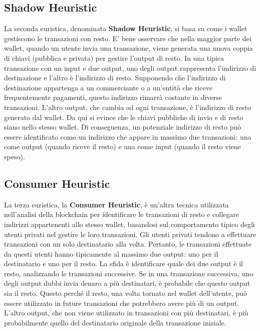 \subsection{Shadow Heuristic}

La seconda euristica, denominata \textbf{Shadow Heuristic}, si basa su come i wallet gestiscono le transazioni con resto. E' bene osservare che nella maggior parte dei wallet, quando un utente invia una transazione, viene generata una nuova coppia di chiavi (pubblica e privata) per gestire l'output di resto. In una tipica transazione con un input e due output, uno degli output rappresenta l'indirizzo di destinazione e l'altro è l'indirizzo di resto. Supponendo che l'indirizzo di destinazione appartenga a un commerciante o a un'entità che riceve frequentemente pagamenti, questo indirizzo rimarrà costante in diverse transazioni. L'altro output, che cambia ad ogni transazione, è l'indirizzo di resto generato dal wallet. Da qui si evince che le chiavi pubbliche di invio e di resto siano nello stesso wallet. Di conseguenza, un potenziale indirizzo di resto può essere identificato come un indirizzo che appare in massimo due transazioni: una come output (quando riceve il resto) e una come input (quando il resto viene speso).

\subsection{Consumer Heuristic}

La terza euristica, la \textbf{Consumer Heuristic}, è un'altra tecnica utilizzata nell'analisi della blockchain per identificare le transazioni di resto e collegare indirizzi appartenenti allo stesso wallet, basandosi sul comportamento tipico degli utenti privati nel gestire le loro transazioni. Gli utenti privati tendono a effettuare transazioni con un solo destinatario alla volta. Pertanto, le transazioni effettuate da questi utenti hanno tipicamente al massimo due output: uno per il destinatario e uno per il resto. La sfida è identificare quale dei due output è il resto, analizzando le transazioni successive. Se in una transazione successiva, uno degli output dubbi invia denaro a più destinatari, è probabile che questo output sia il resto. Questo perché il resto, una volta tornato nel wallet dell'utente, può essere utilizzato in future transazioni che potrebbero avere più di un output. L'altro output, che non viene utilizzato in transazioni con più destinatari, è più probabilmente quello del destinatario originale della transazione iniziale.


